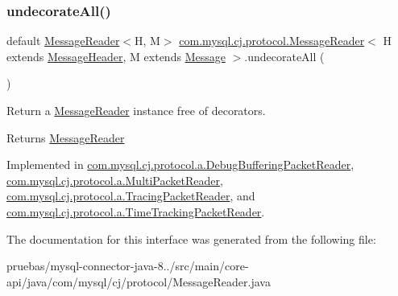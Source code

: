 \mbox{\label{interfacecom_1_1mysql_1_1cj_1_1protocol_1_1_message_reader_a22a326215a91e4d7bff08d1f2c3e1b6d}} 
\subsubsection{\texorpdfstring{undecorate\+All()}{undecorateAll()}}
{\footnotesize\ttfamily default \mbox{\hyperlink{interfacecom_1_1mysql_1_1cj_1_1protocol_1_1_message_reader}{Message\+Reader}}$<$H, M$>$ \mbox{\hyperlink{interfacecom_1_1mysql_1_1cj_1_1protocol_1_1_message_reader}{com.\+mysql.\+cj.\+protocol.\+Message\+Reader}}$<$ H extends \mbox{\hyperlink{interfacecom_1_1mysql_1_1cj_1_1protocol_1_1_message_header}{Message\+Header}}, M extends \mbox{\hyperlink{interfacecom_1_1mysql_1_1cj_1_1protocol_1_1_message}{Message}} $>$.undecorate\+All (\begin{DoxyParamCaption}{ }\end{DoxyParamCaption})}

Return a \mbox{\hyperlink{interfacecom_1_1mysql_1_1cj_1_1protocol_1_1_message_reader}{Message\+Reader}} instance free of decorators.

\begin{DoxyReturn}{Returns}
\mbox{\hyperlink{interfacecom_1_1mysql_1_1cj_1_1protocol_1_1_message_reader}{Message\+Reader}} 
\end{DoxyReturn}


Implemented in \mbox{\hyperlink{classcom_1_1mysql_1_1cj_1_1protocol_1_1a_1_1_debug_buffering_packet_reader_ae6337b7785d1c8adb1b4784387c2f959}{com.\+mysql.\+cj.\+protocol.\+a.\+Debug\+Buffering\+Packet\+Reader}}, \mbox{\hyperlink{classcom_1_1mysql_1_1cj_1_1protocol_1_1a_1_1_multi_packet_reader_a2a1c000ea384788f1ef5d8add224d309}{com.\+mysql.\+cj.\+protocol.\+a.\+Multi\+Packet\+Reader}}, \mbox{\hyperlink{classcom_1_1mysql_1_1cj_1_1protocol_1_1a_1_1_tracing_packet_reader_a92981daf5c4331ba841e31d90d6b43ed}{com.\+mysql.\+cj.\+protocol.\+a.\+Tracing\+Packet\+Reader}}, and \mbox{\hyperlink{classcom_1_1mysql_1_1cj_1_1protocol_1_1a_1_1_time_tracking_packet_reader_ab320fc6184aad94ebdba7260b574421f}{com.\+mysql.\+cj.\+protocol.\+a.\+Time\+Tracking\+Packet\+Reader}}.



The documentation for this interface was generated from the following file\+:\begin{DoxyCompactItemize}
\item 
pruebas/mysql-\/connector-\/java-\/8../src/main/core-\/api/java/com/mysql/cj/protocol/Message\+Reader.\+java\end{DoxyCompactItemize}
